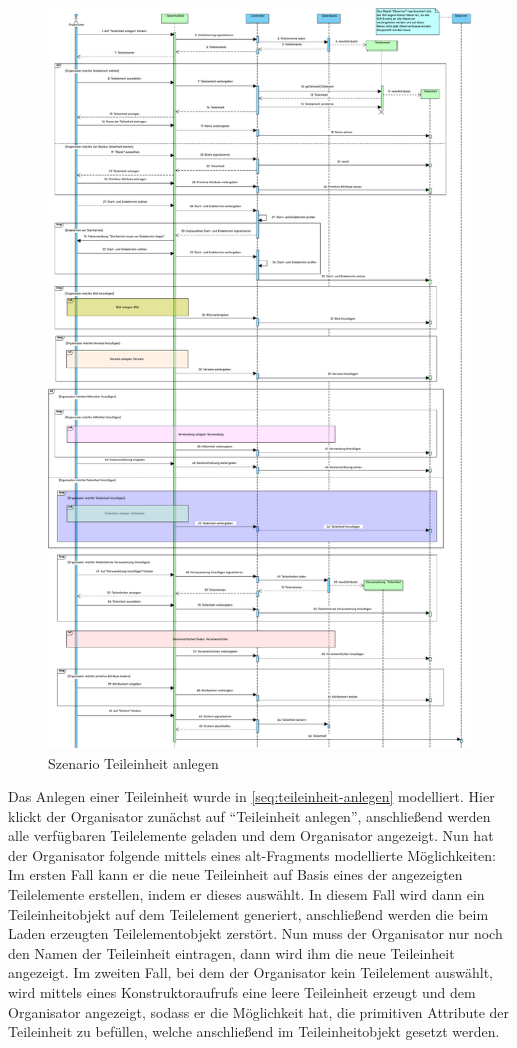 \begin{figure}[ht!]
    \centering
    \includegraphics[width=0.7\columnwidth]{Bilder/seq_Teilevent_anlegen.pdf}
    \caption{Szenario Teileinheit anlegen}
    \label{seq:teileinheit-anlegen}
\end{figure}

Das Anlegen einer Teileinheit wurde in \autoref{seq:teileinheit-anlegen} modelliert. Hier klickt der Organisator zunächst auf \enquote{Teileinheit anlegen}, anschließend werden alle verfügbaren Teilelemente geladen und dem Organisator angezeigt. Nun hat der Organisator folgende mittels eines alt-Fragments modellierte Möglichkeiten: Im ersten Fall kann er die neue Teileinheit auf Basis eines der angezeigten Teilelemente erstellen, indem er dieses auswählt. In diesem Fall wird dann ein Teileinheitobjekt auf dem Teilelement generiert, anschließend werden die beim Laden erzeugten Teilelementobjekt zerstört. Nun muss der Organisator nur noch den Namen der Teileinheit eintragen, dann wird ihm die neue Teileinheit angezeigt. Im zweiten Fall, bei dem der Organisator kein Teilelement auswählt, wird mittels eines Konstruktoraufrufs eine leere Teileinheit erzeugt und dem Organisator angezeigt, sodass er die Möglichkeit hat, die primitiven Attribute der Teileinheit zu befüllen, welche anschließend im Teileinheitobjekt gesetzt werden.

